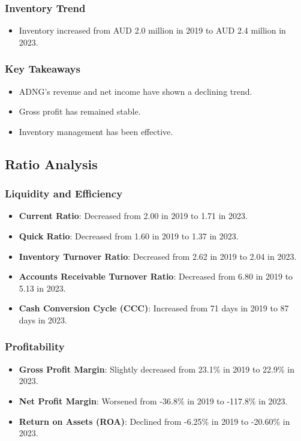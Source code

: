 \documentclass{article}
\begin{document}
\subsubsection{Inventory Trend}
\begin{itemize}
    \item Inventory increased from AUD 2.0 million in 2019 to AUD 2.4 million in 2023.
\end{itemize}

\subsubsection{Key Takeaways}
\begin{itemize}
    \item ADNG's revenue and net income have shown a declining trend.
    \item Gross profit has remained stable.
    \item Inventory management has been effective.
\end{itemize}

\subsection{Ratio Analysis}
\subsubsection{Liquidity and Efficiency}
\begin{itemize}
    \item \textbf{Current Ratio}: Decreased from 2.00 in 2019 to 1.71 in 2023.
    \item \textbf{Quick Ratio}: Decreased from 1.60 in 2019 to 1.37 in 2023.
    \item \textbf{Inventory Turnover Ratio}: Decreased from 2.62 in 2019 to 2.04 in 2023.
    \item \textbf{Accounts Receivable Turnover Ratio}: Decreased from 6.80 in 2019 to 5.13 in 2023.
    \item \textbf{Cash Conversion Cycle (CCC)}: Increased from 71 days in 2019 to 87 days in 2023.
\end{itemize}

\subsubsection{Profitability}
\begin{itemize}
    \item \textbf{Gross Profit Margin}: Slightly decreased from 23.1\% in 2019 to 22.9\% in 2023.
    \item \textbf{Net Profit Margin}: Worsened from -36.8\% in 2019 to -117.8\% in 2023.
    \item \textbf{Return on Assets (ROA)}: Declined from -6.25\% in 2019 to -20.60\% in 2023.
\end{itemize}
\end{document}
